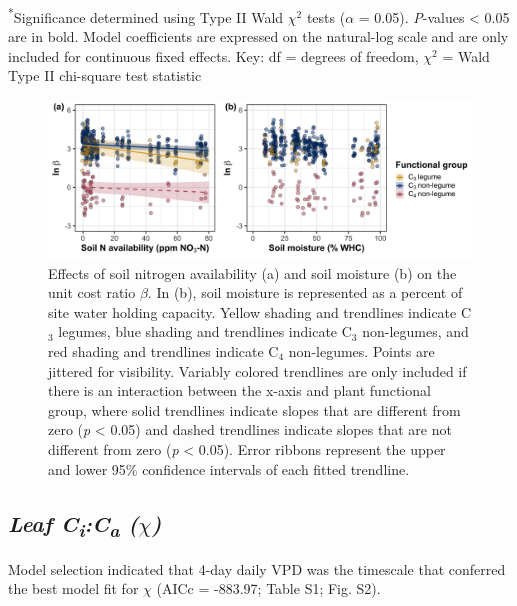 \noindent \textsuperscript{*}Significance determined using Type II Wald $\chi^{2}$ tests ($\alpha$ = 0.05). \textit{P}-values < 0.05 are in bold. Model coefficients are expressed on the natural-log scale and are only included for continuous fixed effects. Key: df = degrees of freedom, $\chi^2$ = Wald Type II chi-square test statistic
\clearpage

\newpage
\begin{landscape}
    \begin{figure}
    \centering
    \includegraphics[scale = 0.075]{ch4_TXeco/figs/TXeco_fig2_beta.png}
    \caption[Effects of soil nitrogen availability and soil moisture on the unit cost ratio $\beta$]{Effects of soil nitrogen availability (a) and soil moisture (b) on the unit cost ratio $\beta$. In (b), soil moisture is represented as a percent of site water holding capacity. Yellow shading and trendlines indicate C$_3$ legumes, blue shading and trendlines indicate C$_3$ non-legumes, and red shading and trendlines indicate C$_4$ non-legumes. Points are jittered for visibility. Variably colored trendlines are only included if there is an interaction between the x-axis and plant functional group, where solid trendlines indicate slopes that are different from zero (\textit{p} < 0.05) and dashed trendlines indicate slopes that are not different from zero (\textit{p} < 0.05). Error ribbons represent the upper and lower 95\% confidence intervals of each fitted trendline.}
    \label{fig:figure4.2}
\end{figure}
\end{landscape}
\clearpage

\subsection{\textit{Leaf C\textsubscript{i}:C\textsubscript{a} ($\chi$)}}
Model selection indicated that 4-day daily VPD was the timescale that conferred the best model fit for $\chi$ (AICc = -883.97; Table S1; Fig. S2).

